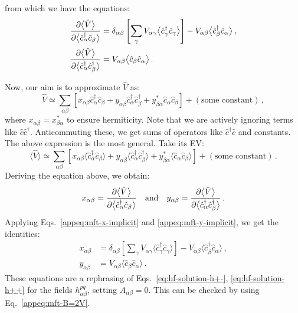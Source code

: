 from which we have the equations:
\begin{align}
	\pdv{\big\langle \hat V \big\rangle}{\big\langle \hat c_\alpha^\dagger \hat c_\beta \big\rangle} &= \delta_{\alpha\beta} \left[
	\sum_\gamma V_{\alpha\gamma} \big\langle \hat c_\gamma^\dagger \hat c_\gamma \big\rangle
	\right] - V_{\alpha\beta} \big\langle \hat c_\beta^\dagger \hat c_\alpha \big\rangle \, , \label{appeq:mft-x-implicit}
	\\
	\pdv{\big\langle \hat V \big\rangle}{\big\langle \hat c_\alpha^\dagger \hat c_\beta^\dagger \big\rangle} &= V_{\alpha\beta} \big\langle \hat c_\beta \hat c_\alpha \big\rangle \, . \label{appeq:mft-y-implicit}
\end{align}

Now, our aim is to approximate $\hat V$ as:
\begin{equation}\label{appeq:mft-V-implicit}
	\hat V \simeq \sum_{\alpha\beta} \left[
	x_{\alpha\beta} \hat c_\alpha^\dagger \hat c_\beta + y_{\alpha\beta} \hat c_\alpha^\dagger \hat c_\beta^\dagger + y_{\beta\alpha}^* \hat c_\alpha \hat c_\beta
	\right] + (\text{some constant}) \, ,
\end{equation}
where $x_{\alpha\beta} = x_{\beta\alpha}^*$ to ensure hermiticity. Note that we are actively ignoring terms like $\hat c \hat c^\dagger$. Anticommuting these, we get sums of operators like $\hat c^\dagger \hat c$ and constants. The above expression is the most general. Take its EV:
\[
\big\langle \hat V \big\rangle \simeq \sum_{\alpha\beta} \left[
x_{\alpha\beta} \big\langle \hat c_\alpha^\dagger \hat c_\beta \big\rangle + y_{\alpha\beta} \big\langle \hat c_\alpha^\dagger \hat c_\beta^\dagger \big\rangle + y_{\beta\alpha}^* \big\langle \hat c_\alpha \hat c_\beta \big\rangle
\right] + (\text{some constant}) \, .
\]
Deriving the equation above, we obtain:
\[
x_{\alpha\beta} = \pdv{\big\langle \hat V \big\rangle}{\big\langle \hat c_\alpha^\dagger \hat c_\beta \big\rangle}
\qq{and}
y_{\alpha\beta} = \pdv{\big\langle \hat V \big\rangle}{\big\langle \hat c_\alpha^\dagger \hat c_\beta^\dagger \big\rangle} \, .
\]
Applying Eqs.~\eqref{appeq:mft-x-implicit} and \eqref{appeq:mft-y-implicit}, we get the identities:
\begin{align}
	x_{\alpha\beta} &= \delta_{\alpha\beta} \left[
	\sum_\gamma V_{\alpha\gamma} \big\langle \hat c_\gamma^\dagger \hat c_\gamma \big\rangle
	\right] - V_{\alpha\beta} \big\langle \hat c_\beta^\dagger \hat c_\alpha \big\rangle \, , \label{appeq:mft-x-explicit}
	\\
	y_{\alpha\beta} &= V_{\alpha\beta} \big\langle \hat c_\beta \hat c_\alpha \big\rangle \, . \label{appeq:mft-y-explicit}
\end{align}
These equations are a rephrasing of Eqs.~\eqref{eq:hf-solution-h+-}, \eqref{eq:hf-solution-h++} for the fields $h_{\alpha\beta}^{pq}$, setting $A_{\alpha\beta}=0$. This can be checked by using Eq.~\eqref{appeq:mft-B=2V}.

